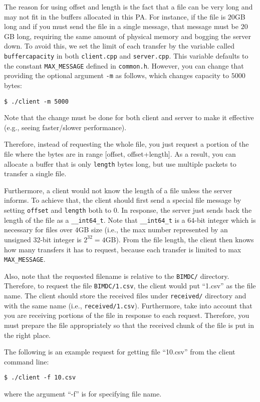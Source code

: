 \documentclass[12pt]{article}
\begin{document}
The reason for using offset and length is the fact that a file can be very long and may not fit in the buffers allocated in this PA. For instance, if the file is $20$GB long and if you must send the file in a single message, that message must be $20$GB long, requiring the same amount of physical memory and bogging the server down. To avoid this, we set the limit of each transfer by the variable called \texttt{buffercapacity} in both \texttt{client.cpp} and \texttt{server.cpp}. This variable defaults to the constant \texttt{MAX\_MESSAGE} defined in \texttt{common.h}. However, you can change that providing the optional argument \texttt{-m} as follows, which changes capacity to $5000$ bytes:
\begin{lstlisting}[style=bash]
	$ ./client -m 5000
\end{lstlisting}
Note that the change must be done for both client and server to make it effective (e.g., seeing faster/slower performance).

Therefore, instead of requesting the whole file, you just request a portion of the file where the bytes are in range [offset, offset+length]. As a result, you can allocate a buffer that is only \texttt{length} bytes long, but use multiple packets to transfer a single file.

Furthermore, a client would not know the length of a file unless the server informs. To achieve that, the client should first send a special file message by setting \texttt{offset} and \texttt{length} both to $0$. In response, the server just sends back the length of the file as a \texttt{\_\_int64\_t}. Note that \texttt{\_\_int64\_t} is a $64$-bit integer which is necessary for files over $4$GB size (i.e., the max number represented by an unsigned 32-bit integer is $2^{32} = 4$GB). From the file length, the client then knows how many transfers it has to request, because each transfer is limited to max \texttt{MAX\_MESSAGE}.

Also, note that the requested filename is relative to the \texttt{BIMDC/} directory. Therefore, to request the file \texttt{BIMDC/1.csv}, the client would put ``1.csv'' as the file name. The client should store the received files under \texttt{received/} directory and with the same name (i.e., \texttt{received/1.csv}). Furthermore, take into account that you are receiving portions of the file in response to each request. Therefore, you must prepare the file appropriately so that the received chunk of the file is put in the right place. 

The following is an example request for getting file ``10.csv'' from the client command line:
\begin{lstlisting}[style=bash]
	$ ./client -f 10.csv
  \end{lstlisting}
where the argument ``-f'' is for specifying file name.
\end{document}
